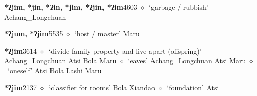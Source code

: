   \begin{list}{}{\leftmargin=1.5em \itemindent=-1.5em}
  \item {\footnotesize \textbf{*ʔjim, *jin, *ʔin, *jim, *ʔjin, *ʔim}}{\tiny 4603}
         $\diamond$~`garbage / rubbish'
         Achang\_Longchuan 
  \item {\footnotesize \textbf{*ʔjum, *ʔjim}}{\tiny 5535}
\hspace{1ex}
         $\diamond$~`host / master'
         Maru 
  \item {\footnotesize \textbf{*ʔjim}}{\tiny 3614}
\hspace{1ex}
         $\diamond$~`divide family property and live apart (offspring)'
         Achang\_Longchuan 
\hspace{1ex}
         Atsi 
\hspace{1ex}
         Bola 
\hspace{1ex}
         Maru 
\hspace{1ex}
         $\diamond$~`eaves'
         Achang\_Longchuan 
\hspace{1ex}
         Atsi 
\hspace{1ex}
         Maru 
\hspace{1ex}
         $\diamond$~`oneself'
         Atsi 
\hspace{1ex}
         Bola 
\hspace{1ex}
         Lashi 
\hspace{1ex}
         Maru 
  \item {\footnotesize \textbf{*ʔjim}}{\tiny 2137}
\hspace{1ex}
         $\diamond$~`classifier for rooms'
         Bola 
\hspace{1ex}
         Xiandao 
\hspace{1ex}
         $\diamond$~`foundation'
         Atsi 

\end{list}

